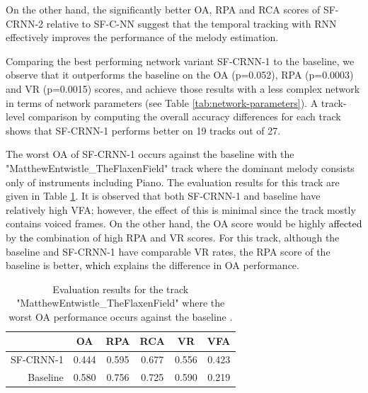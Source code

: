 \documentclass{article}
\newcommand{\jb}[1]{{\textcolor{black}{#1}}}
\newcommand{\jbcor}[2]{{\textcolor{black}{#2}}}
\begin{document}
On the other hand, the significantly better OA, RPA and RCA scores of SF-CRNN-2 relative to SF-C-NN suggest that the temporal tracking with RNN effectively improves the performance of the melody estimation.

Comparing the best performing network variant SF-CRNN-1 to the baseline, we observe that it outperforms the baseline on the OA (p=0.052), RPA (p=0.0003) and VR (p=0.0015) scores, and achieve those results with a less complex network in terms of network parameters (see Table \ref{tab:network-parameters}). A track-level comparison by computing the overall accuracy differences for each track shows that SF-CRNN-1 performs better on 19 tracks out of 27. 

The worst OA of SF-CRNN-1 occurs against the baseline with the "MatthewEntwistle\_TheFlaxenField" track where the dominant melody consists only of instruments including Piano.
The evaluation results for this track are given in Table \ref{tab:metrics-worst-case}. 
It is observed that both SF-CRNN-1 and baseline have relatively high VFA; however, the effect of this is minimal since the track mostly contains voiced frames. On the other hand, the OA score would be highly \jbcor{effected}{affected} by \jb{the} combination of high RPA and VR scores. For this track,  
although the baseline and SF-CRNN-1 have comparable VR rates, the RPA score of the baseline is better\jbcor{ that}{, which} explains the difference in OA performance. 
\begin{table}
 \begin{center}
 \begin{tabular}{|r|c|c|c|c|c|}
  \hline
            & OA      & RPA    & RCA    & VR     & VFA \\
  \hline
  SF-CRNN-1   & 0.444   & 0.595  & 0.677  & 0.556  & 0.423 \\
  \hline
  Baseline  & 0.580	  & 0.756  & 0.725  & 0.590  & 0.219 \\  
  \hline
  \end{tabular}
 \end{center}
 \caption{Evaluation results for the track "MatthewEntwistle\_TheFlaxenField" where the worst OA performance occurs against the baseline \cite{bittner2017_deep}.}
 \label{tab:metrics-worst-case}
\end{table}
\end{document}
